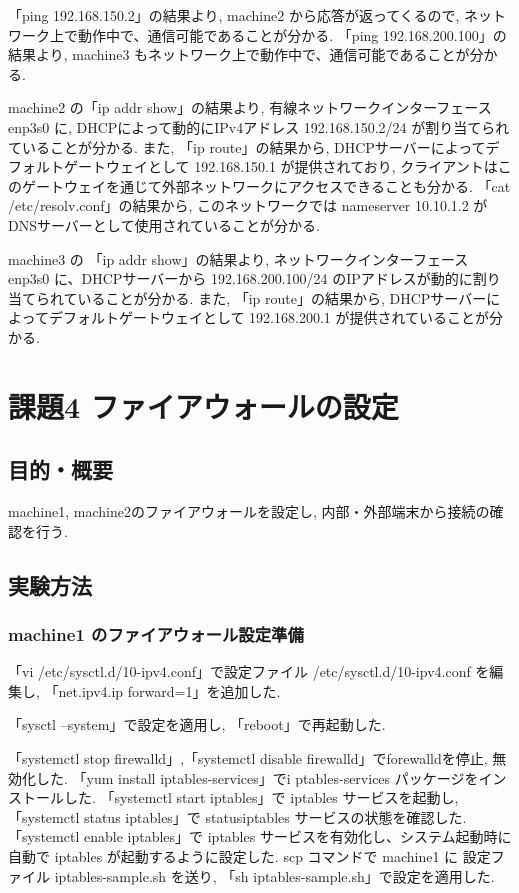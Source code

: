 \documentclass{ltjsarticle} %
\begin{document}
「ping 192.168.150.2」の結果より, machine2 から応答が返ってくるので, ネットワーク上で動作中で、通信可能であることが分かる. 
「ping 192.168.200.100」の結果より, machine3 もネットワーク上で動作中で、通信可能であることが分かる. 

machine2 の「ip addr show」の結果より, 
有線ネットワークインターフェース enp3s0 に, DHCPによって動的にIPv4アドレス 192.168.150.2/24 が割り当てられていることが分かる. 
また, 「ip route」の結果から, DHCPサーバーによってデフォルトゲートウェイとして 192.168.150.1 が提供されており, 
クライアントはこのゲートウェイを通じて外部ネットワークにアクセスできることも分かる. 
「cat /etc/resolv.conf」の結果から, このネットワークでは nameserver 10.10.1.2 がDNSサーバーとして使用されていることが分かる. 

machine3 の 「ip addr show」の結果より, 
ネットワークインターフェース enp3s0 に、DHCPサーバーから 192.168.200.100/24 のIPアドレスが動的に割り当てられていることが分かる. 
また, 「ip route」の結果から, DHCPサーバーによってデフォルトゲートウェイとして 192.168.200.1 が提供されていることが分かる. 



\section{課題4 ファイアウォールの設定}

\subsection{目的・概要}
machine1, machine2のファイアウォールを設定し, 内部・外部端末から接続の確認を行う. 

\subsection{実験方法}

\subsubsection{machine1 のファイアウォール設定準備}
「vi /etc/sysctl.d/10-ipv4.conf」で設定ファイル /etc/sysctl.d/10-ipv4.conf を編集し, 
「net.ipv4.ip forward=1」を追加した. 

「sysctl --system」で設定を適用し, 「reboot」で再起動した. 

「systemctl stop firewalld」,「systemctl disable firewalld」でforewalldを停止, 無効化した. 
「yum install iptables-services」でi ptables-services パッケージをインストールした. 
「systemctl start iptables」で iptables サービスを起動し, 
「systemctl status iptables」で statusiptables サービスの状態を確認した. 
「systemctl enable iptables」で iptables サービスを有効化し、システム起動時に自動で iptables が起動するように設定した. 
scp コマンドで machine1 に 設定ファイル iptables-sample.sh を送り, 「sh iptables-sample.sh」で設定を適用した. 
\end{document}

